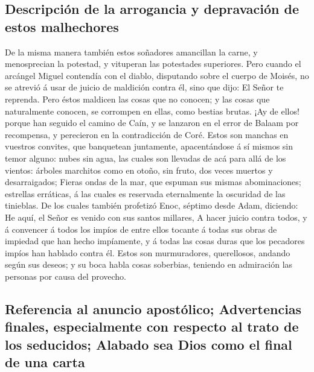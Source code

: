 \hypertarget{descripciuxf3n-de-la-arrogancia-y-depravaciuxf3n-de-estos-malhechores}{%
\subsection{Descripción de la arrogancia y depravación de estos
malhechores}\label{descripciuxf3n-de-la-arrogancia-y-depravaciuxf3n-de-estos-malhechores}}

 De la misma manera también estos soñadores amancillan la
carne, y menosprecian la potestad, y vituperan las potestades
superiores.  Pero cuando el arcángel Miguel contendía con el
diablo, disputando sobre el cuerpo de Moisés, no se atrevió á usar de
juicio de maldición contra él, sino que dijo: El Señor te reprenda.
 Pero éstos maldicen las cosas que no conocen; y las cosas
que naturalmente conocen, se corrompen en ellas, como bestias brutas.
 ¡Ay de ellos! porque han seguido el camino de Caín, y se
lanzaron en el error de Balaam por recompensa, y perecieron en la
contradicción de Coré.  Estos son manchas en vuestros
convites, que banquetean juntamente, apacentándose á sí mismos sin temor
alguno: nubes sin agua, las cuales son llevadas de acá para allá de los
vientos: árboles marchitos como en otoño, sin fruto, dos veces muertos y
desarraigados;  Fieras ondas de la mar, que espuman sus
mismas abominaciones; estrellas erráticas, á las cuales es reservada
eternalmente la oscuridad de las tinieblas.  De los cuales
también profetizó Enoc, séptimo desde Adam, diciendo: He aquí, el Señor
es venido con sus santos millares,  A hacer juicio contra
todos, y á convencer á todos los impíos de entre ellos tocante á todas
sus obras de impiedad que han hecho impíamente, y á todas las cosas
duras que los pecadores impíos han hablado contra él. 
Estos son murmuradores, querellosos, andando según sus deseos; y su boca
habla cosas soberbias, teniendo en admiración las personas por causa del
provecho.

\hypertarget{referencia-al-anuncio-apostuxf3lico-advertencias-finales-especialmente-con-respecto-al-trato-de-los-seducidos-alabado-sea-dios-como-el-final-de-una-carta}{%
\subsection{Referencia al anuncio apostólico; Advertencias finales,
especialmente con respecto al trato de los seducidos; Alabado sea Dios
como el final de una
carta}\label{referencia-al-anuncio-apostuxf3lico-advertencias-finales-especialmente-con-respecto-al-trato-de-los-seducidos-alabado-sea-dios-como-el-final-de-una-carta}}

